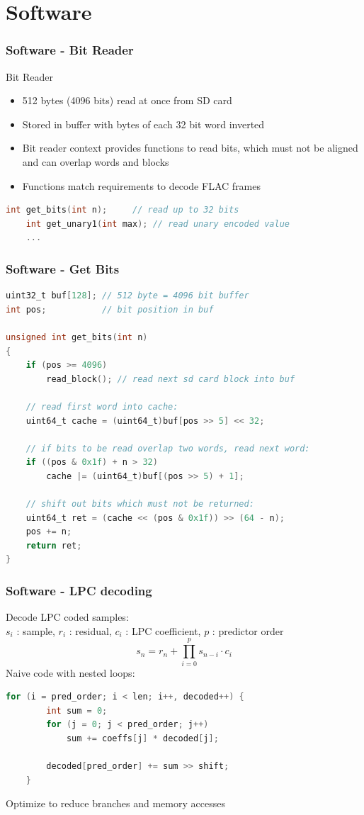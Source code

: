 \documentclass{beamer}
\begin{document}
\section{Software}
\begin{frame}[fragile]\frametitle{Software - Bit Reader}
    Bit Reader
    \begin{itemize}
    \item 512 bytes (4096 bits) read at once from SD card
    \item Stored in buffer with bytes of each 32 bit word inverted
    \item Bit reader context provides functions to read bits, which must
    not be aligned and can overlap words and blocks
    \item Functions match requirements to decode FLAC frames
    \end{itemize}
    \begin{lstlisting}[language=C]
    int get_bits(int n);     // read up to 32 bits
    int get_unary1(int max); // read unary encoded value
    ...
    \end{lstlisting}
\end{frame}
\begin{frame}[fragile]\frametitle{Software - Get Bits}
    \begin{lstlisting}[language=C]
uint32_t buf[128]; // 512 byte = 4096 bit buffer
int pos;           // bit position in buf

unsigned int get_bits(int n)
{
    if (pos >= 4096)
        read_block(); // read next sd card block into buf

    // read first word into cache:
    uint64_t cache = (uint64_t)buf[pos >> 5] << 32;

    // if bits to be read overlap two words, read next word:
    if ((pos & 0x1f) + n > 32)
        cache |= (uint64_t)buf[(pos >> 5) + 1];

    // shift out bits which must not be returned:
    uint64_t ret = (cache << (pos & 0x1f)) >> (64 - n);
    pos += n;
    return ret;
}
    \end{lstlisting}
\end{frame}
\begin{frame}[fragile]\frametitle{Software - LPC decoding}
    Decode LPC coded samples:\\
    $s_i$ : sample, $r_i$ : residual, $c_i$ : LPC coefficient, $p$ : predictor order
    $$ s_n = r_n + \prod_{i=0}^p s_{n-i} \cdot c_i $$
    Naive code with nested loops:
    \begin{lstlisting}[language=C]
    for (i = pred_order; i < len; i++, decoded++) {
        int sum = 0;
        for (j = 0; j < pred_order; j++)
            sum += coeffs[j] * decoded[j];

        decoded[pred_order] += sum >> shift;
    }
    \end{lstlisting}
    Optimize to reduce branches and memory accesses
\end{frame}
\end{document}
